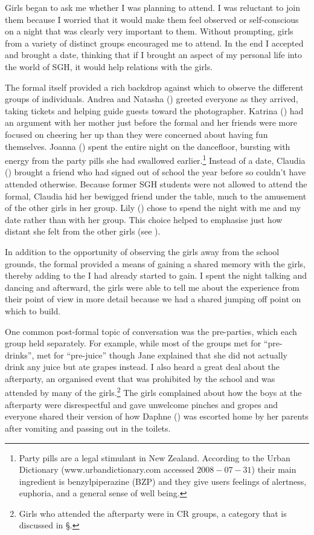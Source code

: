 Girls began to ask me whether I was planning to attend. I was reluctant to join them because I worried that it would make them feel observed or self-conscious on a night that was clearly very important to them. Without prompting, girls from a variety of distinct groups encouraged me to attend. In the end I accepted and brought a date, thinking that if I brought an aspect of my personal life into the world of SGH, it would help relations with the girls. 

The formal itself provided a rich backdrop against which to observe the different groups of individuals. Andrea and Natasha () greeted everyone as they arrived, taking tickets and helping guide guests toward the photographer. Katrina () had an argument with her mother just before the formal and her friends were more focused on cheering her up than they were concerned about having fun themselves. Joanna () spent the entire night on the dancefloor, bursting with energy from the party pills she had swallowed earlier.\footnote{Party pills are a legal stimulant in New Zealand. According to the Urban Dictionary (www.urbandictionary.com accessed $2008-07-31$) their main ingredient is benzylpiperazine (BZP) and they give users feelings of alertness, euphoria, and a general sense of well being.}  Instead of a date, Claudia () brought a friend who had signed out of school the year before so couldn't have attended otherwise. Because former SGH students were not allowed to attend the formal, Claudia hid her bewigged friend under the table, much to the amusement of the other girls in her group. Lily () chose to spend the night with me and my date rather than with her group. This choice helped to emphasise just how distant she felt from the other girls (see ). 
\nocite{urbandict}

\largerpage
In addition to the opportunity of observing the girls away from the school grounds, the formal provided a means of gaining a shared memory with the girls, thereby adding to the  I had already started to gain. I spent the night talking and dancing and afterward, the girls were able to tell me about the experience from their point of view in more detail because we had a shared jumping off point on which to build. 

One common post-formal topic of conversation was the pre-parties, which each group held separately. For example, while most of the groups met for ``pre-drinks'',  met for ``pre-juice'' though Jane explained that she did not actually drink any juice but ate grapes instead. I also heard a great deal about the afterparty, an organised event that was prohibited by the school and was attended by many of the girls.\footnote{Girls who attended the afterparty were in CR groups, a category that is discussed in \S \label{lunchlocale}.}  The girls complained about how the boys at the afterparty  were disrespectful and gave unwelcome pinches and gropes and everyone shared their version of how Daphne () was escorted home by her parents after vomiting and passing out in the toilets.

